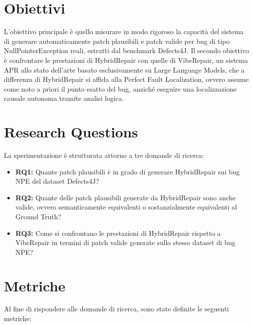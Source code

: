 \section{Obiettivi}

L'obiettivo principale è quello misurare in modo rigoroso la capacità del sistema di 
generare automaticamente patch plausibili e patch valide per bug di tipo NullPointerException 
reali, estratti dal benchmark Defects4J. Il secondo obiettivo è confrontare le prestazioni di HybridRepair 
con quelle di VibeRepair, un sistema APR allo stato dell'arte basato esclusivamente su Large Language Models, 
che a differenza di HybridRepair si affida alla Perfect Fault Localization, ovvero assume come noto a priori il 
punto esatto del bug, anziché eseguire una localizzazione causale autonoma tramite analisi logica.




\section{Research Questions}

La sperimentazione è strutturata attorno a tre domande di ricerca:
\begin{itemize}
    \item \textbf{RQ1:} Quante patch plausibili è in grado di generare HybridRepair sui bug NPE del dataset Defects4J? 
    \item \textbf{RQ2:} Quante delle patch plausibili generate da HybridRepair sono anche valide, ovvero semanticamente equivalenti o 
    sostanzialmente equivalenti al Ground Truth? 
    \item \textbf{RQ3:} Come si confrontano le prestazioni di HybridRepair rispetto a VibeRepair in termini di patch 
    valide generate sullo stesso dataset di bug NPE?

\end{itemize}



\section{Metriche}
\label{sec:metriche}

Al fine di rispondere alle domande di ricerca, sono state definite le seguenti metriche:

